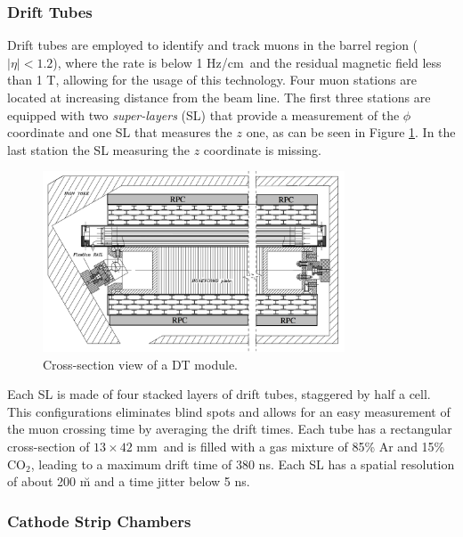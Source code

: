 \subsubsection*{Drift Tubes}

Drift tubes are employed to identify and track muons in the barrel region ($|\eta| < 1.2$), where the rate is below 1 Hz/cm\sq ~and the residual magnetic field less than 1 T, allowing for the usage of this technology. Four muon stations are located at increasing distance from the beam line. The first three stations are equipped with two \emph{super-layers} (SL) that provide a measurement of the $\phi$ coordinate and one SL that measures the $z$ one, as can be seen in Figure \ref{fig:dt_module}. %
In the last station the SL measuring the $z$ coordinate is missing. 

\begin{figure}
\begin{center}
\includegraphics[angle=-0,width=0.8\textwidth]{2_LHC_and_CMS/pics/cms_dt.png}
\caption{Cross-section view of a DT module.
\label{fig:dt_module}
}
\end{center}
\end{figure}


Each SL is made of four stacked layers of drift tubes, staggered by half a cell. This configurations eliminates blind spots and allows for an easy measurement of the muon crossing time by averaging the drift times. Each tube has a rectangular cross-section of $13\times42$ mm\sq ~and is filled with a gas mixture of 85\% Ar and 15\% CO$_2$, leading to a maximum drift time of 380 ns. Each SL has a spatial resolution of about 200 \u m and a time jitter below 5 ns.

\subsubsection*{Cathode Strip Chambers}

